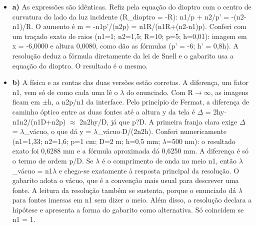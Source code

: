 \documentclass{article}%
\begin{document}
\begin{itemize}%
\item%
\textbf{a)} As expressões são idênticas. Refiz pela equação do dioptro com o centro de curvatura do lado da luz incidente (R\_dioptro = -R): n1/p + n2/p' = -(n2-n1)/R. O aumento é m = -n1p'/(n2p) = n1R/(n1R+(n2-n1)p). Conferi com um traçado exato de raios (n1=1; n2=1,5; R=10; p=5; h=0,01): imagem em x = -6,0000 e altura 0,0080, como dão as fórmulas (p' = -6; h' = 0,8h). A resolução deduz a fórmula diretamente da lei de Snell e o gabarito usa a equação do dioptro. O resultado é o mesmo.%
\item%
\textbf{b)} A física e as contas das duas versões estão corretas. A diferença, um fator n1, vem só de como cada uma lê o $\lambda$ do enunciado. Com R$\to$$\infty$, as imagens ficam em $\pm$h, a n2p/n1 da interface. Pelo princípio de Fermat, a diferença de caminho óptico entre as duas fontes até a altura y da tela é $\Delta$ = 2hy$\cdot$n1n2/(n1D+n2p) $\approx$ 2n2hy/D, já que p?D. A primeira franja clara exige $\Delta$ = $\lambda$\_vácuo, o que dá y = $\lambda$\_vácuo$\cdot$D/(2n2h). Conferi numericamente (n1=1,33; n2=1,6; p=1 cm; D=2 m; h=0,5 mm; $\lambda$=500 nm): o resultado exato foi 0,6288 mm e a fórmula aproximada dá 0,6250 mm. A diferença é só o termo de ordem p/D. Se $\lambda$ é o comprimento de onda no meio n1, então $\lambda$\_vácuo = n1$\lambda$ e chega{-}se exatamente à resposta principal da resolução. O gabarito adota o vácuo, que é a convenção mais usual para descrever uma fonte. A leitura da resolução também se sustenta, porque o enunciado dá $\lambda$ para fontes imersas em n1 sem dizer o meio. Além disso, a resolução declara a hipótese e apresenta a forma do gabarito como alternativa. Só coincidem se n1 = 1.%
\end{itemize}%
\end{document}
